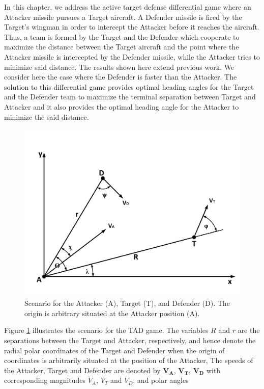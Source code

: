 \label{simulation}

In this chapter, we address the active target defense differential game where an Attacker missile pursues a Target aircraft. A Defender missile is fired by the Target’s wingman in order to intercept the Attacker before it reaches the aircraft. Thus, a team is formed by the Target and the Defender which
cooperate to maximize the distance between the Target aircraft and the point where the Attacker missile is intercepted by the Defender missile, while the Attacker tries to minimize said distance. The results shown here extend previous work. We consider here the case where the Defender is faster than
the Attacker. The solution to this differential game provides optimal heading angles for the Target and the Defender team to maximize the terminal separation between Target and Attacker and it also provides the optimal heading angle for the Attacker to minimize the said distance.

\begin{figure}[H]
	\centering
	\includegraphics[width=1.0\textwidth]{fig/fig7-1.pdf}
	\caption{Scenario for the Attacker (A), Target (T), and Defender (D). The origin is arbitrary situated at the Attacker position (A).}
	\label{7.1}
\end{figure}

Figure \ref{7.1} illustrates the scenario for the TAD game. The variables $R$ and $r$ are the separations between the Target and Attacker, respectively, and hence denote the radial polar coordinates of the Target and Defender when the origin of coordinates is arbitrarily situated at the position of the Attacker, The speeds of the Attacker, Target and Defender are denoted by $\boldsymbol{V_A}$, $\boldsymbol{V_T}$, $\boldsymbol{V_D}$ with corresponding magnitudes $V_A$, $V_T$ and $V_D$, and polar angles 

